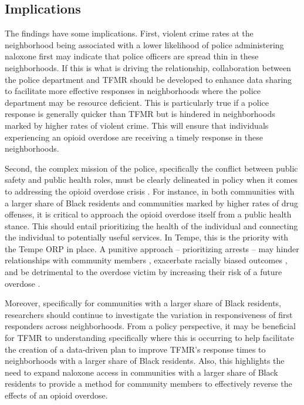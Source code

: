 \subsection{Implications}

The findings have some implications. First, violent crime rates at the neighborhood being associated with a lower likelihood of police administering naloxone first may indicate that police officers are spread thin in these neighborhoods. If this is what is driving the relationship, collaboration between the police department and TFMR should be developed to enhance data sharing to facilitate more effective responses in neighborhoods where the police department may be resource deficient. This is particularly true if a police response is generally quicker than TFMR but is hindered in neighborhoods marked by higher rates of violent crime. This will ensure that individuals experiencing an opioid overdose are receiving a timely response in these neighborhoods. 

Second, the complex mission of the police, specifically the conflict between public safety and public health roles, must be clearly delineated in policy when it comes to addressing the opioid overdose crisis \parencite{del_pozo_beyond_2021}. For instance, in both communities with a larger share of Black residents and communities marked by higher rates of drug offenses, it is critical to approach the opioid overdose itself from a public health stance. This should entail prioritizing the health of the individual and connecting the individual to potentially useful services. In Tempe, this is the priority with the Tempe ORP in place. A punitive approach -- prioritizing arrests -- may hinder relationships with community members \parencite{van_der_meulen_thats_2021}, exacerbate racially biased outcomes \parencite{kochel_effect_2011}, and be detrimental to the overdose victim by increasing their risk of a future overdose \parencite{binswanger_clinical_2016, ray_spatiotemporal_2023}.

Moreover, specifically for communities with a larger share of Black residents, researchers should continue to investigate the variation in responsiveness of first responders across neighborhoods. From a policy perspective, it may be beneficial for TFMR to understanding specifically where this is occurring to help facilitate the creation of a data-driven plan to improve TFMR's response times to neighborhoods with a larger share of Black residents. Also, this highlights the need to expand naloxone access in communities with a larger share of Black residents to provide a method for community members to effectively reverse the effects of an opioid overdose. 

